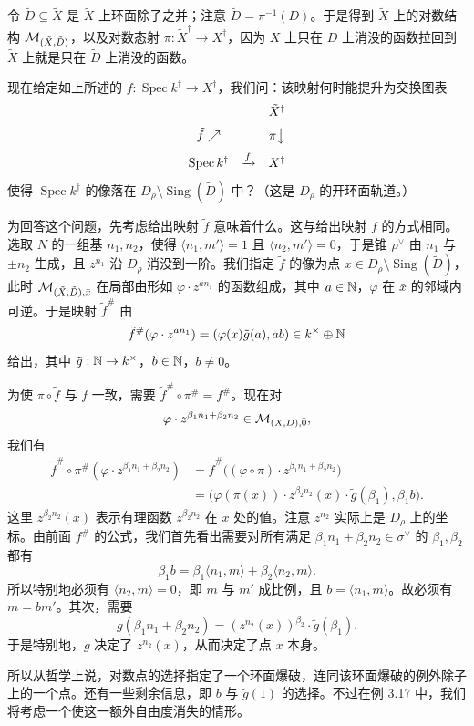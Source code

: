 \begin{example}
令 $\tilde D\subseteq\tilde X$ 是 $\tilde X$ 上环面除子之并；注意 $\tilde D=\pi^{-1}(D)$。于是得到 $\tilde X$ 上的对数结构 $\mathcal{M}_{(\tilde X,\tilde D)}$，以及对数态射 $\pi:\tilde X^\dagger\to X^\dagger$，因为 $X$ 上只在 $D$ 上消没的函数拉回到 $\tilde X$ 上就是只在 $\tilde D$ 上消没的函数。

现在给定如上所述的 $f:\operatorname{Spec} k^\dagger\to X^\dagger$，我们问：该映射何时能提升为交换图表
\[
  \begin{array}{ccc}
    & & \tilde X^{\dagger}\\[6pt]
    \tilde f\nearrow & & \pi\big\downarrow\\[6pt]
    \operatorname{Spec}k^{\dagger} & \xrightarrow{f} & X^{\dagger}
  \end{array}
\]
使得 $\operatorname{Spec} k^\dagger$ 的像落在 $D_\rho\setminus\operatorname{Sing}(\tilde D)$ 中？（这是 $D_\rho$ 的开环面轨道。）

为回答这个问题，先考虑给出映射 $\tilde f$ 意味着什么。这与给出映射 $f$ 的方式相同。选取 $N$ 的一组基 $n_1,n_2$，使得 $\langle n_1,m'\rangle=1$ 且 $\langle n_2,m'\rangle=0$，于是锥 $\rho^{\vee}$ 由 $n_1$ 与 $\pm n_2$ 生成，且 $z^{n_1}$ 沿 $D_\rho$ 消没到一阶。我们指定 $\tilde f$ 的像为点 $x\in D_\rho\setminus\operatorname{Sing}(\tilde D)$，此时 $\mathcal{M}_{(\tilde X,\tilde D),\bar x}$ 在局部由形如 $\varphi\cdot z^{an_1}$ 的函数组成，其中 $a\in\mathbb{N}$，$\varphi$ 在 $\bar x$ 的邻域内可逆。于是映射 $\tilde f^{\#}$ 由
\[
  \tilde f^{\#}(\varphi\cdot z^{an_1})=(\varphi(x)\tilde g(a),ab)\in k^{\times}\oplus\mathbb{N}
\]
给出，其中 $\tilde g:\mathbb{N}\to k^{\times}$，$b\in\mathbb{N}$，$b\ne 0$。

为使 $\pi\circ\tilde f$ 与 $f$ 一致，需要 $\tilde f^{\#}\circ\pi^{\#}=f^{\#}$。现在对
\[
  \varphi\cdot z^{\beta_1n_1+\beta_2n_2}\in\mathcal{M}_{(X,D),\bar 0},
\]
我们有
\[
  \begin{aligned}
    \tilde f^{\#}\circ\pi^{\#}(\varphi\cdot z^{\beta_1n_1+\beta_2n_2})
    &=\tilde f^{\#}\bigl((\varphi\circ\pi)\cdot z^{\beta_1n_1+\beta_2n_2}\bigr)\\
    &=\bigl(\varphi(\pi(x))\cdot z^{\beta_2n_2}(x)\cdot\tilde g(\beta_1),\beta_1b\bigr).
  \end{aligned}
\]
这里 $z^{\beta_2n_2}(x)$ 表示有理函数 $z^{\beta_2n_2}$ 在 $x$ 处的值。注意 $z^{n_2}$ 实际上是 $D_\rho$ 上的坐标。由前面 $f^{\#}$ 的公式，我们首先看出需要对所有满足 $\beta_1n_1+\beta_2n_2\in\sigma^{\vee}$ 的 $\beta_1,\beta_2$ 都有
\[
  \beta_1b=\beta_1\langle n_1,m\rangle+\beta_2\langle n_2,m\rangle.
\]
所以特别地必须有 $\langle n_2,m\rangle=0$，即 $m$ 与 $m'$ 成比例，且 $b=\langle n_1,m\rangle$。故必须有 $m=bm'$。其次，需要
\[
  g(\beta_1n_1+\beta_2n_2)=(z^{n_2}(x))^{\beta_2}\cdot\tilde g(\beta_1).
\]
于是特别地，$g$ 决定了 $z^{n_2}(x)$，从而决定了点 $x$ 本身。

所以从哲学上说，对数点的选择指定了一个环面爆破，连同该环面爆破的例外除子上的一个点。还有一些剩余信息，即 $b$ 与 $\tilde g(1)$ 的选择。不过在例 3.17 中，我们将考虑一个使这一额外自由度消失的情形。
\end{example}

